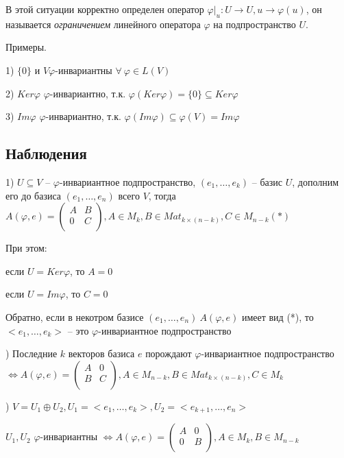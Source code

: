 В этой ситуации корректно определен оператор $\varphi |_u : U \rightarrow U, u \rightarrow \varphi(u)$, он называется \textit{ограничением} линейного оператора $\varphi$ на подпространство $U$.

\bigskip
Примеры.

1) $\{0\}$ и $V \varphi$-инвариантны $\forall \ \varphi \in L(V)$

2) $Ker \varphi$ $\varphi$-инвариантно, т.к. $\varphi(Ker \varphi) = \{0\} \subseteq Ker \varphi$

3) $Im \varphi$ $\varphi$-инвариантно, т.к. $\varphi (Im \varphi) \subseteq \varphi (V) = Im \varphi$

\subsection{Наблюдения}

1) $U \subseteq V$ -- $\varphi$-инвариантное подпространство, $(e_1, \dots, e_k)$ -- базис $U$, дополним его до базиса $(e_1, \dots, e_n)$ всего $V$, тогда $A(\varphi, e) = \left(
\begin{array}{c|c}
  A & B  \\
  \hline
  0 & C  \\
\end{array}
\right), A \in M_k, B \in Mat_{k \times (n - k)}, C \in M_{n-k} (*)$

При этом:

если $U = Ker \varphi$, то $A = 0$

если $U = Im \varphi$, то $C = 0$

Обратно, если в некотром базисе $(e_1, \dots, e_n) \ A(\varphi, e)$ имеет вид (*), то $<e_1, \dots, e_k>$ -- это $\varphi$-инвариантное подпространство

) Последние $k$ векторов базиса $e$ порождают $\varphi$-инвариантное подпространство $\Leftrightarrow A(\varphi, e) = \left(
\begin{array}{c|c}
  A & 0  \\
  \hline
  B & C  \\
\end{array}
\right), A \in M_{n-k}, B \in Mat_{k \times (n - k)}, C \in M_k$

) $V = U_1 \oplus U_2, U_1 = <e_1, \dots, e_k>, U_2 = <e_{k+1}, \dots, e_n>$

$U_1, U_2$ $\varphi$-инвариантны $\Leftrightarrow A(\varphi, e) = \left(
\begin{array}{c|c}
  A & 0  \\
  \hline
  0 & B  \\
\end{array}
\right), A \in M_k, B \in M_{n-k}$

